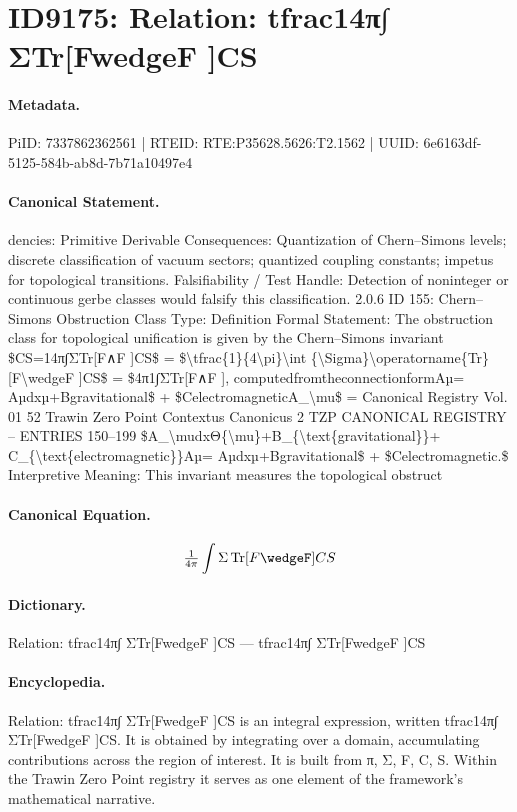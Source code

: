 \section*{ID9175: Relation: tfrac14π∫ ΣTr[FwedgeF ]CS}
\paragraph{Metadata.}
PiID: 7337862362561 | RTEID: RTE:P35628.5626:T2.1562 | UUID: 6e6163df-5125-584b-ab8d-7b71a10497e4

\paragraph{Canonical Statement.}
dencies: Primitive Derivable Consequences: Quantization of Chern–Simons levels; discrete classification of vacuum sectors; quantized coupling constants; impetus for topological transitions. Falsifiability / Test Handle: Detection of noninteger or continuous gerbe classes would falsify this classification. 2.0.6 ID 155: Chern–Simons Obstruction Class Type: Definition Formal Statement: The obstruction class for topological unification is given by the Chern–Simons invariant \$CS=14π∫ΣTr[F∧F ]CS\$ = \$\textbackslash{}tfrac\{1\}\{4\textbackslash{}pi\}\textbackslash{}int \{\textbackslash{}Sigma\}\textbackslash{}operatorname\{Tr\}[F\textbackslash{}wedgeF ]CS\$ = \$4π1∫ΣTr[F∧F ], computedfromtheconnectionformAµ= Aµdxµ+Bgravitational\$ + \$CelectromagneticA\_\textbackslash{}mu\$ = Canonical Registry Vol. 01 52 Trawin Zero Point Contextus Canonicus 2 TZP CANONICAL REGISTRY – ENTRIES 150–199 \$A\_\textbackslash{}mudxΘ\{\textbackslash{}mu\}+B\_\{\textbackslash{}text\{gravitational\}\}+ C\_\{\textbackslash{}text\{electromagnetic\}\}Aµ= Aµdxµ+Bgravitational\$ + \$Celectromagnetic.\$ Interpretive Meaning: This invariant measures the topological obstruct

\paragraph{Canonical Equation.}
\[
\tfrac{1}{4\pi}\int {\Sigma}\operatorname{Tr}[F\wedgeF ]CS
\]

\paragraph{Dictionary.}
Relation: tfrac14π∫ ΣTr[FwedgeF ]CS — tfrac14π∫ ΣTr[FwedgeF ]CS

\paragraph{Encyclopedia.}
Relation: tfrac14π∫ ΣTr[FwedgeF ]CS is an integral expression, written tfrac14π∫ ΣTr[FwedgeF ]CS. It is obtained by integrating over a domain, accumulating contributions across the region of interest. It is built from π, Σ, F, C, S. Within the Trawin Zero Point registry it serves as one element of the framework's mathematical narrative.
